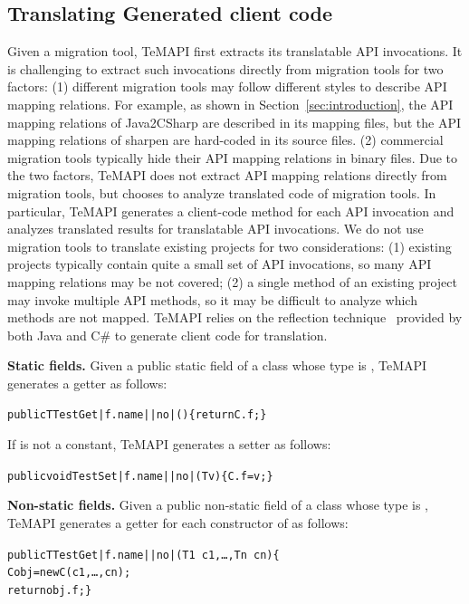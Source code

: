 \subsection{Translating Generated client code}
\label{sec:approach:generating}
Given a migration tool, TeMAPI first extracts its translatable API invocations. It is challenging to extract such invocations directly from migration tools for two factors: (1) different migration tools may follow different styles to describe API mapping relations. For example, as shown in Section~\ref{sec:introduction}, the API mapping relations of Java2CSharp are described in its mapping files, but the API mapping relations of sharpen are hard-coded in its source files. (2) commercial migration tools typically hide their API mapping relations in binary files. Due to the two factors, TeMAPI does not extract API mapping relations directly from migration tools, but chooses to analyze translated code of migration tools. In particular, TeMAPI generates a client-code method for each API invocation and analyzes translated results for translatable API invocations. We do not use migration tools to translate existing projects for two considerations: (1) existing projects typically contain quite a small set of API invocations, so many API mapping relations may be not covered; (2) a single method of an existing project may invoke multiple API methods, so it may be difficult to analyze which methods are not mapped. TeMAPI relies on the reflection technique~\cite{maes1987concepts} provided by both Java and C\# to generate client code for translation.

\textbf{Static fields.} Given a public static field  of a class  whose type is , TeMAPI generates a getter as follows:
\begin{CodeOut}%
\begin{alltt}
 public T TestGet|f.name||no|()\{ return C.f; \}
\end{alltt}
\end{CodeOut}

If  is not a constant, TeMAPI generates a setter as follows:
\begin{CodeOut}%
\begin{alltt}
 public void TestSet|f.name||no|(T v)\{ C.f = v; \}
\end{alltt}
\end{CodeOut}

\textbf{Non-static fields.} Given a public non-static field  of a class  whose type is , TeMAPI generates a getter for each constructor  of  as follows:
\begin{CodeOut}%
\begin{alltt}
 public T TestGet|f.name||no|(T1\ c1,\ldots, Tn\ cn)\{
    C obj = new C(c1,\ldots, cn);
    return obj.f; \}
\end{alltt}
\end{CodeOut}

